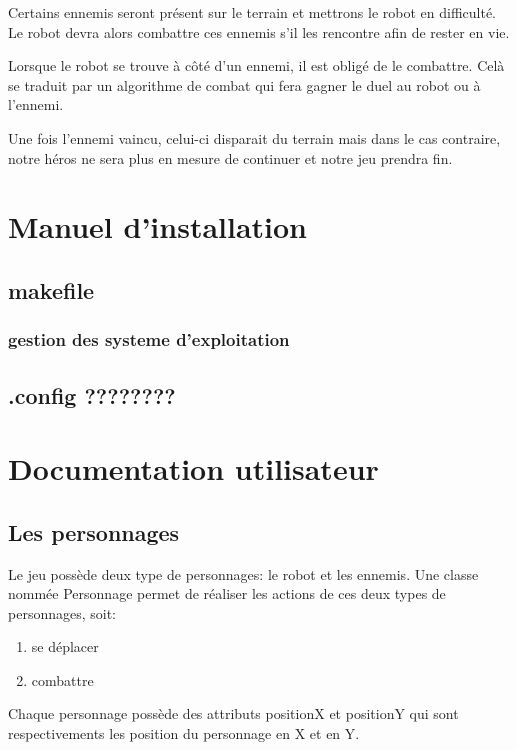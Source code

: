 \documentclass[a4paper 12pts]{article}
\begin{document}
Certains ennemis seront présent sur le terrain et mettrons le robot en difficulté. 
Le robot devra alors combattre ces ennemis s'il les rencontre afin de rester en vie.

Lorsque le robot se trouve à côté d'un ennemi, il est obligé de le combattre. 
Celà se traduit par un algorithme de combat qui fera gagner le duel au robot ou à l'ennemi. 

Une fois l'ennemi vaincu, celui-ci disparait du terrain mais dans le cas contraire, 
notre héros ne sera plus en mesure de continuer et notre jeu prendra fin.



\section{Manuel d'installation}

\subsection{makefile}



\subsubsection{gestion des systeme d'exploitation}

\subsection{.config ????????}


\section{Documentation utilisateur}


\subsection{Les personnages}
Le jeu possède deux type de personnages: le robot et les ennemis. Une classe nommée Personnage permet de réaliser les actions de ces deux types de personnages, soit:
\begin{enumerate}
	\item se déplacer
	\item combattre
\end{enumerate}
Chaque personnage possède des attributs positionX et positionY qui sont respectivements les position du personnage en X et en Y.
\end{document}

